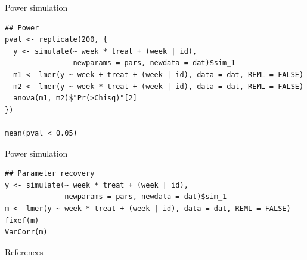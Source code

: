 \documentclass[aspectratio=169]{beamer}
\begin{document}
\begin{frame}[fragile]{Power simulation}
  \begin{lstlisting}
## Power
pval <- replicate(200, {
  y <- simulate(~ week * treat + (week | id),
                newparams = pars, newdata = dat)$sim_1
  m1 <- lmer(y ~ week + treat + (week | id), data = dat, REML = FALSE)
  m2 <- lmer(y ~ week * treat + (week | id), data = dat, REML = FALSE)
  anova(m1, m2)$"Pr(>Chisq)"[2]
})

mean(pval < 0.05)
  \end{lstlisting}
\end{frame}

\begin{frame}[fragile]{Power simulation}
  \begin{lstlisting}
## Parameter recovery
y <- simulate(~ week * treat + (week | id),
              newparams = pars, newdata = dat)$sim_1
m <- lmer(y ~ week * treat + (week | id), data = dat, REML = FALSE)
fixef(m)
VarCorr(m)
  \end{lstlisting}
\end{frame}

\appendix
\begin{frame}{References}


\end{frame}
\end{document}
